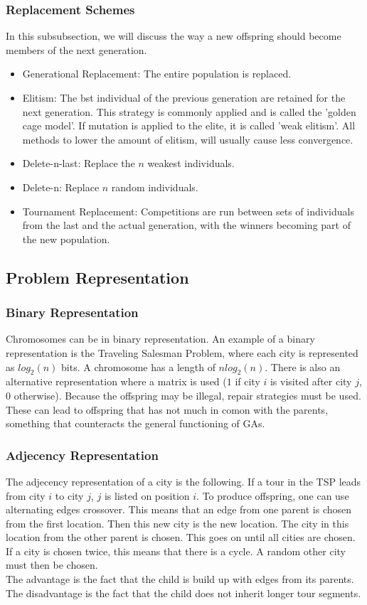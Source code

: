 \documentclass[12pt]{article}
\begin{document}
\subsubsection{Replacement Schemes}
In this subsubsection, we will discuss the way a new offspring should become members of the next generation.
\begin{itemize}
\item Generational Replacement: The entire population is replaced.
\item Elitism: The bst individual of the previous generation are retained for the next generation. This strategy is commonly applied and is called the 'golden cage model'. If mutation is applied to the elite, it is called 'weak elitism'. All methods to lower the amount of elitism, will usually cause less convergence.
\item Delete-n-last: Replace the $n$ weakest individuals.
\item Delete-n: Replace $n$ random individuals.
\item Tournament Replacement: Competitions are run between sets of individuals from the last and the actual generation, with the winners becoming part of the new population.
\end{itemize}
\subsection{Problem Representation}
\subsubsection{Binary Representation}
Chromosomes can be in binary representation. An example of a binary representation is the Traveling Salesman Problem, where each city is represented as $log_2(n)$ bits. A chromosome has a length of $nlog_2(n)$. There is also an alternative representation where a matrix is used ($1$ if city $i$ is visited after city $j$, $0$ otherwise). Because the offspring may be illegal, repair strategies must be used. These can lead to offspring that has not much in comon with the parents, something that counteracts the general functioning of GAs.
\subsubsection{Adjecency Representation}
The adjecency representation of a city is the following. If a tour in the TSP leads from city $i$ to city $j$, $j$ is listed on position $i$. To produce offspring, one can use alternating edges crossover. This means that an edge from one parent is chosen from the first location. Then this new city is the new location. The city in this location from the other parent is chosen. This goes on until all cities are chosen. If a city is chosen twice, this means that there is a cycle. A random other city must then be chosen.\\
The advantage is the fact that the child is build up with edges from its parents. The disadvantage is the fact that the child does not inherit longer tour segments.
\end{document}
